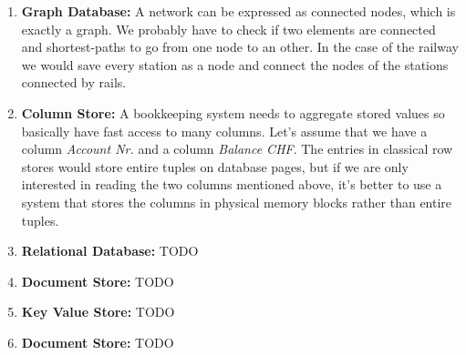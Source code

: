 \documentclass{article} %
\begin{document}
\begin{enumerate}[(1)]
\item \textbf{Graph Database:} A network can be expressed as connected nodes, which is exactly a graph. We probably have to check if two elements are connected and shortest-paths to go from one node to an other. In the case of the railway we would save every station as a node and connect the nodes of the stations connected by rails.

\item \textbf{Column Store:} A bookkeeping system needs to aggregate stored values so basically have fast access to many columns. Let's assume that we have a column \textit{Account Nr.} and a column \textit{Balance CHF}. The entries in classical row stores would store entire tuples on database pages, but if we are only interested in reading the two columns mentioned above, it's better to use a system that stores the columns in physical memory blocks rather than entire tuples.

\item \textbf{Relational Database:} TODO

\item \textbf{Document Store:} TODO

\item \textbf{Key Value Store:} TODO

\item \textbf{Document Store:} TODO
\end{enumerate}
\end{document}
